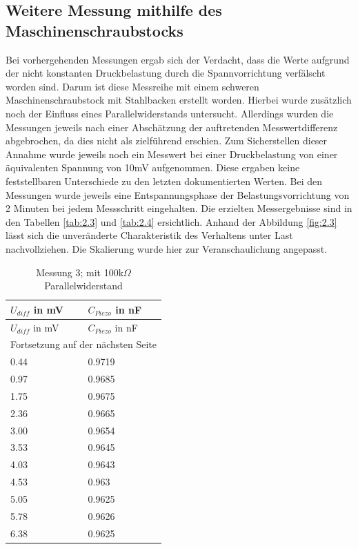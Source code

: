 \documentclass[11pt]{scrreprt} %
\begin{document}
\subsection{Weitere Messung mithilfe des Maschinenschraubstocks}
Bei vorhergehenden Messungen ergab sich der Verdacht, dass die Werte aufgrund der nicht konstanten Druckbelastung durch die Spannvorrichtung verfälscht worden sind. Darum ist diese Messreihe mit einem schweren Maschinenschraubstock mit Stahlbacken erstellt worden. Hierbei wurde zusätzlich noch der Einfluss eines Parallelwiderstands untersucht. Allerdings wurden die Messungen jeweils nach einer Abschätzung der auftretenden Messwertdifferenz abgebrochen, da dies nicht als zielführend erschien. Zum Sicherstellen dieser Annahme wurde jeweils noch ein Messwert bei einer Druckbelastung von einer äquivalenten Spannung von 10mV aufgenommen. Diese ergaben keine feststellbaren Unterschiede zu den letzten dokumentierten Werten. Bei den Messungen wurde jeweils eine Entspannungsphase der Belastungsvorrichtung von 2 Minuten bei jedem Messschritt eingehalten. Die erzielten Messergebnisse sind in den Tabellen \vref{tab:2.3} und \vref{tab:2.4} ersichtlich. Anhand der Abbildung \vref{fig:2.3} lässt sich die unveränderte Charakteristik des Verhaltens unter Last nachvollziehen. Die Skalierung wurde hier zur Veranschaulichung angepasst. 

\setlongtables
\begin{longtable}{| l | l |}
\caption{Messung 3; mit 100k$\Omega$ Parallelwiderstand}\\
\hline
$U_{diff}$ in mV&$C_{Piezo}$ in nF\\
\hline
\endfirsthead
\hline
$U_{diff}$ in mV&$C_{Piezo}$ in nF\\
\hline
\endhead
\hline
\multicolumn{2}{|c|}{Fortsetzung auf der nächsten Seite}\\
\hline
\endfoot
\hline \hline
\endlastfoot
\hline
\label{tab:2.3}%
0.44&0.9719\\
0.97&0.9685\\
1.75&0.9675\\
2.36&0.9665\\
3.00&0.9654\\
3.53&0.9645\\
4.03&0.9643\\
4.53&0.963\\
5.05&0.9625\\
5.78&0.9626\\
6.38&0.9625\\
\end{longtable}
\end{document}
